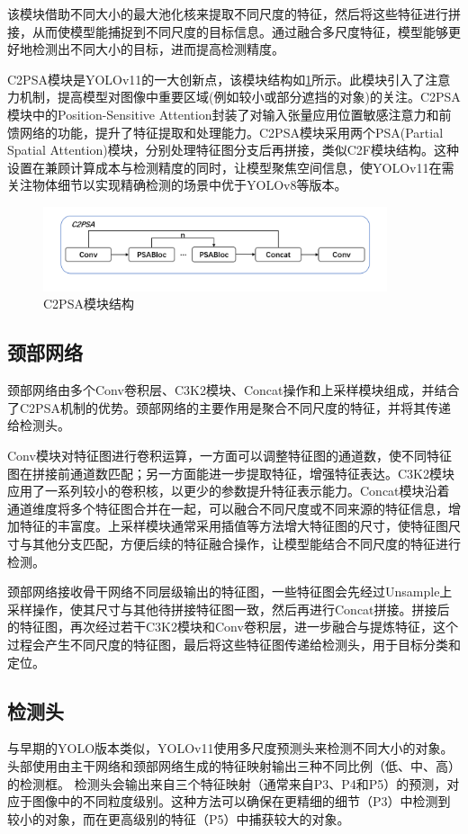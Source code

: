 该模块借助不同大小的最大池化核来提取不同尺度的特征，然后将这些特征进行拼接，从而使模型能捕捉到不同尺度的目标信息。通过融合多尺度特征，模型能够更好地检测出不同大小的目标，进而提高检测精度。

C2PSA模块是YOLOv11的一大创新点，该模块结构如\ref{fig:c2psa}所示。此模块引入了注意力机制，提高模型对图像中重要区域(例如较小或部分遮挡的对象)的关注。C2PSA模块中的Position-Sensitive Attention封装了对输入张量应用位置敏感注意力和前馈网络的功能，提升了特征提取和处理能力。C2PSA模块采用两个PSA(Partial Spatial Attention)模块，分别处理特征图分支后再拼接，类似C2F模块结构。这种设置在兼顾计算成本与检测精度的同时，让模型聚焦空间信息，使YOLOv11在需关注物体细节以实现精确检测的场景中优于YOLOv8等版本。

\begin{figure}[!htb]
  \centering
  \includegraphics[width=0.9\textwidth]{figs/chap02/c2psa.png}
  \caption{C2PSA模块结构}
  \label{fig:c2psa}
\end{figure}

\subsection{颈部网络}
颈部网络由多个Conv卷积层、C3K2模块、Concat操作和上采样模块组成，并结合了C2PSA机制的优势。颈部网络的主要作用是聚合不同尺度的特征，并将其传递给检测头。

Conv模块对特征图进行卷积运算，一方面可以调整特征图的通道数，使不同特征图在拼接前通道数匹配；另一方面能进一步提取特征，增强特征表达。C3K2模块应用了一系列较小的卷积核，以更少的参数提升特征表示能力。Concat模块沿着通道维度将多个特征图合并在一起，可以融合不同尺度或不同来源的特征信息，增加特征的丰富度。上采样模块通常采用插值等方法增大特征图的尺寸，使特征图尺寸与其他分支匹配，方便后续的特征融合操作，让模型能结合不同尺度的特征进行检测。

颈部网络接收骨干网络不同层级输出的特征图，一些特征图会先经过Unsample上采样操作，使其尺寸与其他待拼接特征图一致，然后再进行Concat拼接。拼接后的特征图，再次经过若干C3K2模块和Conv卷积层，进一步融合与提炼特征，这个过程会产生不同尺度的特征图，最后将这些特征图传递给检测头，用于目标分类和定位。

\subsection{检测头}
与早期的YOLO版本类似，YOLOv11使用多尺度预测头来检测不同大小的对象。头部使用由主干网络和颈部网络生成的特征映射输出三种不同比例（低、中、高）的检测框。
检测头会输出来自三个特征映射（通常来自P3、P4和P5）的预测，对应于图像中的不同粒度级别。这种方法可以确保在更精细的细节（P3）中检测到较小的对象，而在更高级别的特征（P5）中捕获较大的对象​。

